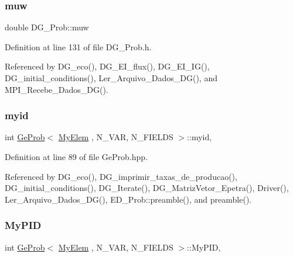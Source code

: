\subsubsection{\texorpdfstring{muw}{muw}}
{\footnotesize\ttfamily double D\+G\+\_\+\+Prob\+::muw\hspace{0.3cm}{\ttfamily [private]}}



Definition at line 131 of file D\+G\+\_\+\+Prob.\+h.



Referenced by D\+G\+\_\+eco(), D\+G\+\_\+\+E\+I\+\_\+flux(), D\+G\+\_\+\+E\+I\+\_\+\+I\+G(), D\+G\+\_\+initial\+\_\+conditions(), Ler\+\_\+\+Arquivo\+\_\+\+Dados\+\_\+\+D\+G(), and M\+P\+I\+\_\+\+Recebe\+\_\+\+Dados\+\_\+\+D\+G().

\mbox{\label{classGeProb_a45014741c0457991fb88b1dc1d2d31bc}} 
\subsubsection{\texorpdfstring{myid}{myid}}
{\footnotesize\ttfamily int \hyperlink{classGeProb}{Ge\+Prob}$<$ \hyperlink{DG__Prob_8h_a83cd887ced9a6587428f267e50cd4787}{My\+Elem} , N\+\_\+\+V\+AR, N\+\_\+\+F\+I\+E\+L\+DS $>$\+::myid\hspace{0.3cm}{\ttfamily [protected]}, {\ttfamily [inherited]}}



Definition at line 89 of file Ge\+Prob.\+hpp.



Referenced by D\+G\+\_\+eco(), D\+G\+\_\+imprimir\+\_\+taxas\+\_\+de\+\_\+producao(), D\+G\+\_\+initial\+\_\+conditions(), D\+G\+\_\+\+Iterate(), D\+G\+\_\+\+Matriz\+Vetor\+\_\+\+Epetra(), Driver(), Ler\+\_\+\+Arquivo\+\_\+\+Dados\+\_\+\+D\+G(), E\+D\+\_\+\+Prob\+::preamble(), and preamble().

\mbox{\label{classGeProb_a646b814acd21db4a20bbbd9fe159da3f}} 
\subsubsection{\texorpdfstring{My\+P\+ID}{MyPID}}
{\footnotesize\ttfamily int \hyperlink{classGeProb}{Ge\+Prob}$<$ \hyperlink{DG__Prob_8h_a83cd887ced9a6587428f267e50cd4787}{My\+Elem} , N\+\_\+\+V\+AR, N\+\_\+\+F\+I\+E\+L\+DS $>$\+::My\+P\+ID\hspace{0.3cm}{\ttfamily [protected]}, {\ttfamily [inherited]}}



